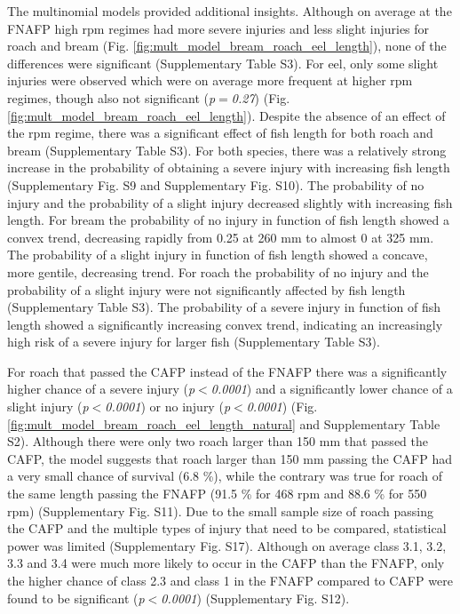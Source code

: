 \documentclass[fleqn,10pt]{wlscirep}
\begin{document}
The multinomial models provided additional insights. Although on average at the FNAFP high rpm regimes had more severe injuries and less slight injuries for roach and bream (Fig. \ref{fig:mult_model_bream_roach_eel_length}), none of the differences were significant (Supplementary Table S3). For eel, only some slight injuries were observed which were on average more frequent at higher rpm regimes, though also not significant (\textit{p$=$0.27}) (Fig. \ref{fig:mult_model_bream_roach_eel_length}). Despite the absence of an effect of the rpm regime, there was a significant effect of fish length for both roach and bream (Supplementary Table S3). For both species, there was a relatively strong increase in the probability of obtaining a severe injury with increasing fish length (Supplementary Fig. S9 and Supplementary Fig. S10). The probability of no injury and the probability of a slight injury decreased slightly with increasing fish length. For bream the probability of no injury in function of fish length showed a convex trend, decreasing rapidly from 0.25 at 260 mm to almost 0 at 325 mm. The probability of a slight injury in function of fish length showed a concave, more gentile, decreasing trend. For roach the probability of no injury and the probability of a slight injury were not significantly affected by fish length (Supplementary Table S3). The probability of a severe injury in function of fish length showed a significantly increasing convex trend, indicating an increasingly high risk of a severe injury for larger fish (Supplementary Table S3).

For roach that passed the CAFP instead of the FNAFP there was a significantly higher chance of a severe injury (\textit{p$<$0.0001}) and a significantly lower chance of a slight injury (\textit{p$<$0.0001}) or no injury  (\textit{p$<$0.0001}) (Fig. \ref{fig:mult_model_bream_roach_eel_length_natural} and Supplementary Table S2). Although there were only two roach larger than 150 mm that passed the CAFP, the model suggests that roach larger than 150 mm passing the CAFP had a very small chance of survival (6.8 \%), while the contrary was true for roach of the same length passing the FNAFP (91.5 \% for 468 rpm and 88.6 \% for 550 rpm) (Supplementary Fig. S11). Due to the small sample size of roach passing the CAFP and the multiple types of injury that need to be compared, statistical power was limited (Supplementary Fig. S17). Although on average class 3.1, 3.2, 3.3 and 3.4 were much more likely to occur in the CAFP than the FNAFP, only the higher chance of class 2.3 and class 1 in the FNAFP compared to CAFP were found to be significant (\textit{p$<$0.0001}) (Supplementary Fig. S12). 
\end{document}
